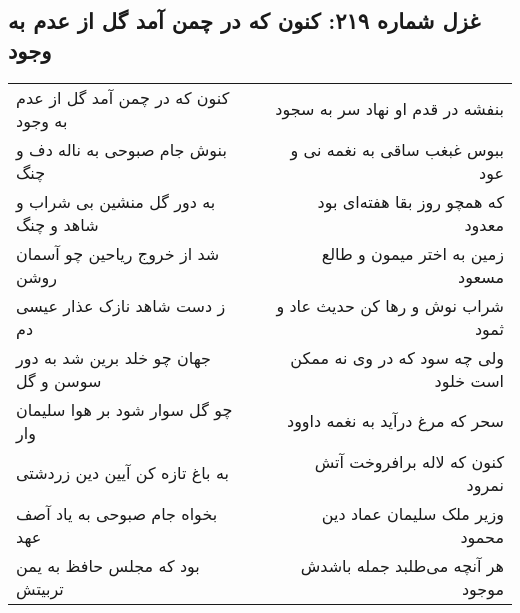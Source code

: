 \begin{center}
\section*{غزل شماره ۲۱۹: کنون که در چمن آمد گل از عدم به وجود}
\label{sec:sh219}
\begin{longtable}{l p{0.5cm} r}
کنون که در چمن آمد گل از عدم به وجود
&&
بنفشه در قدم او نهاد سر به سجود
\\
بنوش جام صبوحی به ناله دف و چنگ
&&
ببوس غبغب ساقی به نغمه نی و عود
\\
به دور گل منشین بی شراب و شاهد و چنگ
&&
که همچو روز بقا هفته‌ای بود معدود
\\
شد از خروج ریاحین چو آسمان روشن
&&
زمین به اختر میمون و طالع مسعود
\\
ز دست شاهد نازک عذار عیسی دم
&&
شراب نوش و رها کن حدیث عاد و ثمود
\\
جهان چو خلد برین شد به دور سوسن و گل
&&
ولی چه سود که در وی نه ممکن است خلود
\\
چو گل سوار شود بر هوا سلیمان وار
&&
سحر که مرغ درآید به نغمه داوود
\\
به باغ تازه کن آیین دین زردشتی
&&
کنون که لاله برافروخت آتش نمرود
\\
بخواه جام صبوحی به یاد آصف عهد
&&
وزیر ملک سلیمان عماد دین محمود
\\
بود که مجلس حافظ به یمن تربیتش
&&
هر آنچه می‌طلبد جمله باشدش موجود
\\
\end{longtable}
\end{center}
